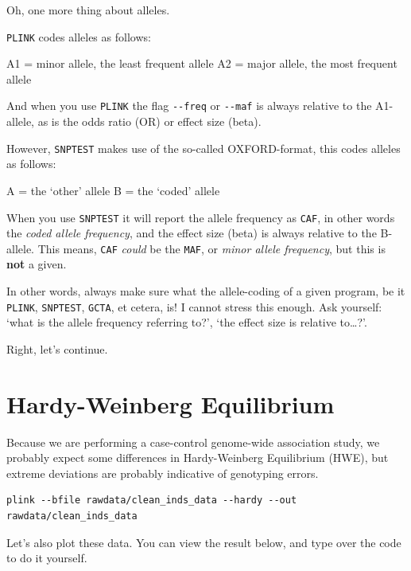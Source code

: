 \documentclass[
]{book}
\newenvironment{Shaded}{\begin{snugshade}}{\end{snugshade}}
\newcommand{\FunctionTok}[1]{\textcolor[rgb]{0.00,0.00,0.00}{#1}}
\newcommand{\NormalTok}[1]{#1}
\newcommand{\OtherTok}[1]{\textcolor[rgb]{0.56,0.35,0.01}{#1}}
\newcommand{\SpecialCharTok}[1]{\textcolor[rgb]{0.00,0.00,0.00}{#1}}
\newcommand{\StringTok}[1]{\textcolor[rgb]{0.31,0.60,0.02}{#1}}
\begin{document}
Oh, one more thing about alleles.

\texttt{PLINK} codes alleles as follows:

A1 = minor allele, the least frequent allele
A2 = major allele, the most frequent allele

And when you use \texttt{PLINK} the flag \texttt{-\/-freq} or \texttt{-\/-maf} is always relative to the A1-allele, as is the odds ratio (OR) or effect size (beta).

However, \texttt{SNPTEST} makes use of the so-called OXFORD-format, this codes alleles as follows:

A = the `other' allele
B = the `coded' allele

When you use \texttt{SNPTEST} it will report the allele frequency as \texttt{CAF}, in other words the \emph{coded allele frequency}, and the effect size (beta) is always relative to the B-allele. This means, \texttt{CAF} \emph{could} be the \texttt{MAF}, or \emph{minor allele frequency}, but this is \textbf{not} a given.

In other words, always make sure what the allele-coding of a given program, be it \texttt{PLINK}, \texttt{SNPTEST}, \texttt{GCTA}, et cetera, is! I cannot stress this enough. Ask yourself: `what is the allele frequency referring to?', `the effect size is relative to\ldots?'.

Right, let's continue.

\hypertarget{hardy-weinberg-equilibrium}{%
\section{Hardy-Weinberg Equilibrium}\label{hardy-weinberg-equilibrium}}

Because we are performing a case-control genome-wide association study, we probably expect some differences in Hardy-Weinberg Equilibrium (HWE), but extreme deviations are probably indicative of genotyping errors.

\begin{verbatim}
plink --bfile rawdata/clean_inds_data --hardy --out rawdata/clean_inds_data
\end{verbatim}

Let's also plot these data. You can view the result below, and type over the code to do it yourself.

\begin{Shaded}
\end{Shaded}
\end{document}
